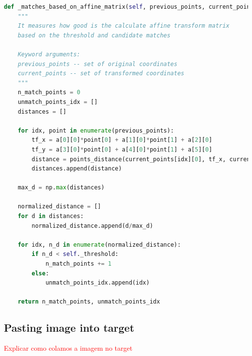 \documentclass[]{IEEEtran}
\newcommand\todolist[1]{\textcolor{red}{#1}}
\begin{document}
\begin{lstlisting}[language=Python, caption={Evaluates calculated Affine Transform matrix}, label={code:eval}]
  def _matches_based_on_affine_matrix(self, previous_points, current_points, a):
    """
    It measures how good is the calculate affine transform matrix
    based on the threshold and candidate matches

    Keyword arguments:
    previous_points -- set of original coordinates
    current_points -- set of transformed coordinates
    """
    n_match_points = 0
    unmatch_points_idx = []
    distances = []

    for idx, point in enumerate(previous_points):
        tf_x = a[0][0]*point[0] + a[1][0]*point[1] + a[2][0]
        tf_y = a[3][0]*point[0] + a[4][0]*point[1] + a[5][0]
        distance = points_distance(current_points[idx][0], tf_x, current_points[idx][1], tf_y)
        distances.append(distance)

    max_d = np.max(distances)

    normalized_distance = []
    for d in distances:
        normalized_distance.append(d/max_d)

    for idx, n_d in enumerate(normalized_distance):
        if n_d < self._threshold:
            n_match_points += 1
        else:
            unmatch_points_idx.append(idx)

    return n_match_points, unmatch_points_idx
\end{lstlisting}



\subsection{Pasting image into target}
\todolist{Explicar como colamos a imagem no target}
\end{document}
